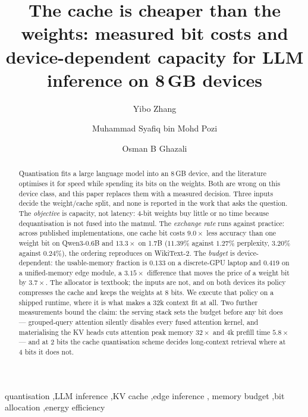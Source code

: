 \documentclass[5p]{elsarticle}
\begin{document}
\begin{frontmatter}

\title{The cache is cheaper than the weights: measured bit costs and device-dependent capacity for LLM inference on 8\,GB devices}

\author[uum]{Yibo Zhang}
\author[uum]{Muhammad Syafiq bin Mohd Pozi}
\author[uum]{Osman B Ghazali}


\begin{abstract}
Quantisation fits a large language model into an 8\,GB device, and the
literature optimises it for speed while spending its bits on the weights. Both
are wrong on this device class, and this paper replaces them with a measured
decision. Three inputs decide the weight/cache split, and none is reported in
the work that asks the question. The \emph{objective} is capacity, not latency:
4-bit weights buy little or no time because dequantisation is not fused into
the matmul. The \emph{exchange rate} runs against practice: across published
implementations, one cache bit costs $9.0\times$ less accuracy than one weight
bit on Qwen3-0.6B and $13.3\times$ on 1.7B ($11.39\%$ against $1.27\%$
perplexity, $3.20\%$ against $0.24\%$), the ordering reproduces on WikiText-2.
The \emph{budget} is device-dependent: the usable-memory fraction is $0.133$ on
a discrete-GPU laptop and $0.419$ on a unified-memory edge module, a
$3.15\times$ difference that moves the price of a weight bit by $3.7\times$.
The allocator is textbook; the inputs are not, and on both devices its policy
compresses the cache and keeps the weights at 8 bits. We execute that policy on
a shipped runtime, where it is what makes a 32k context fit at all. Two further
measurements bound the claim: the serving stack sets the budget before any bit
does --- grouped-query attention silently disables every fused attention
kernel, and materialising the KV heads cuts attention peak memory $32\times$
and 4k prefill time $5.8\times$ --- and at 2 bits the cache quantisation scheme
decides long-context retrieval where at 4 bits it does not.
\end{abstract}

\begin{keyword}
quantisation \sep LLM inference \sep KV cache \sep edge inference \sep
memory budget \sep bit allocation \sep energy efficiency
\end{keyword}

\end{frontmatter}
\end{document}
